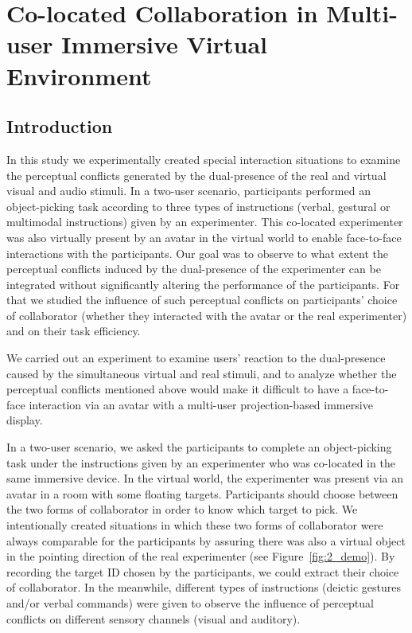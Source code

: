 \chapter{Co-located Collaboration in Multi-user Immersive Virtual Environment}
\label{chapter:colocated}
\minitoc

\section{Introduction}
In this study we experimentally created special interaction situations to examine the perceptual conflicts generated by the dual-presence of the real and virtual visual and audio stimuli. In a two-user scenario, participants performed an object-picking task according to three types of instructions (verbal, gestural or multimodal instructions) given by an experimenter. This co-located experimenter was also virtually present by an avatar in the virtual world to enable face-to-face interactions with the participants. Our goal was to observe to what extent the perceptual conflicts induced by the dual-presence of the experimenter can be integrated without significantly altering the performance of the participants. For that we studied the influence of such perceptual conflicts on participants' choice of collaborator (whether they interacted with the avatar or the real experimenter) and on their task efficiency.

We carried out an experiment to examine users' reaction to the dual-presence caused by the simultaneous virtual and real stimuli, and to analyze whether the perceptual conflicts mentioned above would make it difficult to have a face-to-face interaction via an avatar with a multi-user projection-based immersive display.

In a two-user scenario, we asked the participants to complete an object-picking task under the instructions given by an experimenter who was co-located in the same immersive device. In the virtual world, the experimenter was present via an avatar in a room with some floating targets. Participants should choose between the two forms of collaborator in order to know which target to pick. We intentionally created situations in which these two forms of collaborator were always comparable for the participants by assuring there was also a virtual object in the pointing direction of the real experimenter (see Figure~\ref{fig:2_demo}). By recording the target ID chosen by the participants, we could extract their choice of collaborator. In the meanwhile, different types of instructions (deictic gestures and/or verbal commands) were given to observe the influence of perceptual conflicts on different sensory channels (visual and auditory).


